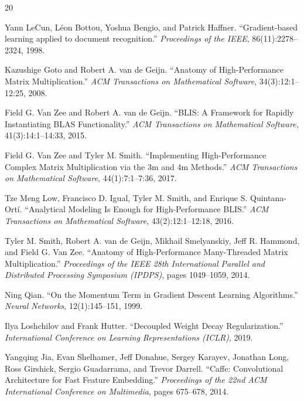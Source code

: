 \documentclass[a4paper,11pt,oneside]{article}
\begin{document}
\clearpage
{}
\begin{thebibliography}{20}

Yann LeCun, Léon Bottou, Yoshua Bengio, and Patrick Haffner.
``Gradient-based learning applied to document recognition.''
\textit{Proceedings of the IEEE}, 86(11):2278--2324, 1998.

Kazushige Goto and Robert A. van de Geijn.
``Anatomy of High-Performance Matrix Multiplication.''
\textit{ACM Transactions on Mathematical Software}, 34(3):12:1--12:25, 2008.

Field G. Van Zee and Robert A. van de Geijn.
``BLIS: A Framework for Rapidly Instantiating BLAS Functionality.''
\textit{ACM Transactions on Mathematical Software}, 41(3):14:1--14:33, 2015.

Field G. Van Zee and Tyler M. Smith.
``Implementing High-Performance Complex Matrix Multiplication via the 3m and 4m Methods.''
\textit{ACM Transactions on Mathematical Software}, 44(1):7:1--7:36, 2017.

Tze Meng Low, Francisco D. Igual, Tyler M. Smith, and Enrique S. Quintana-Ort{\'i}.
``Analytical Modeling Is Enough for High-Performance BLIS.''
\textit{ACM Transactions on Mathematical Software}, 43(2):12:1--12:18, 2016.

Tyler M. Smith, Robert A. van de Geijn, Mikhail Smelyanskiy, Jeff R. Hammond, and Field G. Van Zee.
``Anatomy of High-Performance Many-Threaded Matrix Multiplication.''
\textit{Proceedings of the IEEE 28th International Parallel and Distributed Processing Symposium (IPDPS)}, pages 1049--1059, 2014.

Ning Qian.
``On the Momentum Term in Gradient Descent Learning Algorithms.''
\textit{Neural Networks}, 12(1):145--151, 1999.

Ilya Loshchilov and Frank Hutter.
``Decoupled Weight Decay Regularization.''
\textit{International Conference on Learning Representations (ICLR)}, 2019.

Yangqing Jia, Evan Shelhamer, Jeff Donahue, Sergey Karayev, Jonathan Long, Ross Girshick, Sergio Guadarrama, and Trevor Darrell.
``Caffe: Convolutional Architecture for Fast Feature Embedding.''
\textit{Proceedings of the 22nd ACM International Conference on Multimedia}, pages 675--678, 2014.


\end{thebibliography}
\end{document}
